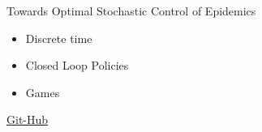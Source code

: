 \begin{frame}{Towards Optimal Stochastic Control of Epidemics}
    \begin{Huge}
        \begin{itemize}
            \item Discrete time
            \item Closed Loop Policies
            \item Games
        \end{itemize}
    \end{Huge}
    \href{https://github.com/SaulDiazInfante/Beamer-xxxii-semana-unison-2022-AppliedMathWorkshop.git}{Git-Hub}
    \\
\end{frame}
